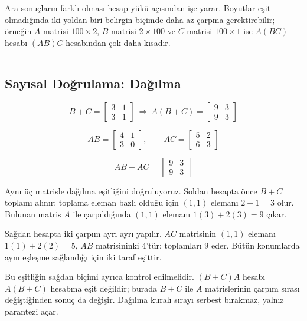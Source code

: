 \documentclass[
  letterpaper,
  DIV=11,
  numbers=noendperiod]{scrartcl}
\begin{document}
Ara sonuçların farklı olması hesap yükü açısından işe yarar. Boyutlar
eşit olmadığında iki yoldan biri belirgin biçimde daha az çarpma
gerektirebilir; örneğin \(A\) matrisi \(100\times2\), \(B\) matrisi
\(2\times100\) ve \(C\) matrisi \(100\times1\) ise \(A(BC)\) hesabı
\((AB)C\) hesabından çok daha kısadır.

\begin{center}\rule{0.5\linewidth}{0.5pt}\end{center}

\subsection{Sayısal Doğrulama:
Dağılma}\label{sayux131sal-doux11frulama-daux11fux131lma}

\[
B+C=\begin{bmatrix}3&1\\3&1\end{bmatrix}
\ \Longrightarrow\
A(B+C)=\begin{bmatrix}9&3\\9&3\end{bmatrix}
\]

\[
AB=\begin{bmatrix}4&1\\3&0\end{bmatrix},
\qquad
AC=\begin{bmatrix}5&2\\6&3\end{bmatrix}
\]

\[
AB+AC=\begin{bmatrix}9&3\\9&3\end{bmatrix}
\]

Aynı üç matrisle dağılma eşitliğini doğruluyoruz. Soldan hesapta önce
\(B+C\) toplamı alınır; toplama eleman bazlı olduğu için \((1,1)\)
elemanı \(2+1=3\) olur. Bulunan matris \(A\) ile çarpıldığında \((1,1)\)
elemanı \(1(3)+2(3)=9\) çıkar.

Sağdan hesapta iki çarpım ayrı ayrı yapılır. \(AC\) matrisinin \((1,1)\)
elemanı \(1(1)+2(2)=5\), \(AB\) matrisininki \(4\)'tür; toplamları \(9\)
eder. Bütün konumlarda aynı eşleşme sağlandığı için iki taraf eşittir.

Bu eşitliğin sağdan biçimi ayrıca kontrol edilmelidir. \((B+C)A\) hesabı
\(A(B+C)\) hesabına eşit değildir; burada \(B+C\) ile \(A\)
matrislerinin çarpım sırası değiştiğinden sonuç da değişir. Dağılma
kuralı sırayı serbest bırakmaz, yalnız parantezi açar.
\end{document}
